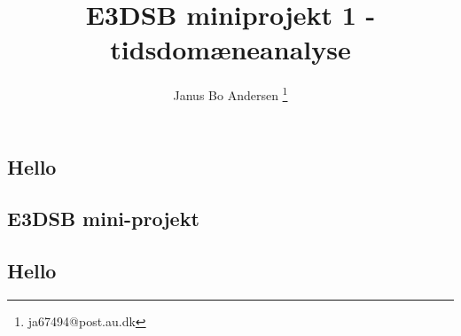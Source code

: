 \documentclass[a4paper]{report}
\author{Janus Bo Andersen \thanks{ja67494@post.au.dk}}
\begin{document}



    
    
    \title{E3DSB miniprojekt 1 - tidsdomæneanalyse}
        

    \maketitle

\tableofcontents
\newpage


    \begin{par}

\section{Hello}

\end{par} \vspace{1em}


\subsection*{E3DSB mini-projekt}



\subsection*{Hello}
\end{document}
